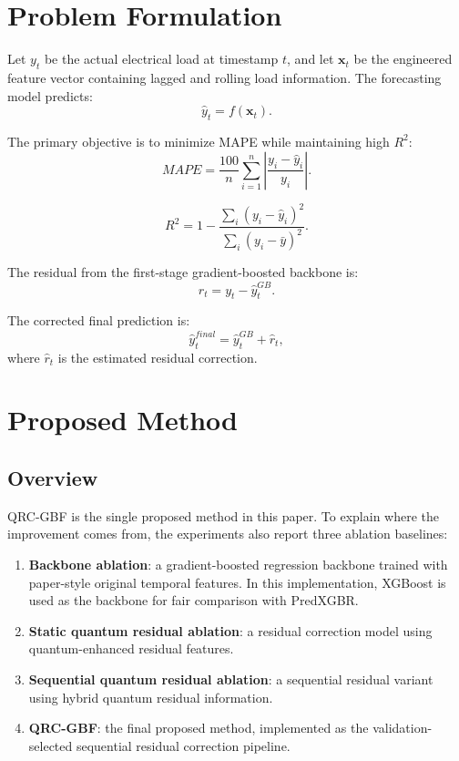 \documentclass[11pt]{article}
\begin{document}
\section{Problem Formulation}
Let $y_t$ be the actual electrical load at timestamp $t$, and let $\mathbf{x}_t$ be the engineered feature vector containing lagged and rolling load information. The forecasting model predicts:
\begin{equation}
\hat{y}_t = f(\mathbf{x}_t).
\end{equation}

The primary objective is to minimize MAPE while maintaining high $R^2$:
\begin{equation}
MAPE = \frac{100}{n}\sum_{i=1}^{n}\left|\frac{y_i-\hat{y}_i}{y_i}\right|.
\end{equation}

\begin{equation}
R^2 = 1 - \frac{\sum_i (y_i-\hat{y}_i)^2}{\sum_i (y_i-\bar{y})^2}.
\end{equation}

The residual from the first-stage gradient-boosted backbone is:
\begin{equation}
r_t = y_t - \hat{y}^{GB}_t.
\end{equation}

The corrected final prediction is:
\begin{equation}
\hat{y}^{final}_t = \hat{y}^{GB}_t + \hat{r}_t,
\end{equation}
where $\hat{r}_t$ is the estimated residual correction.

\section{Proposed Method}
\subsection{Overview}
QRC-GBF is the single proposed method in this paper. To explain where the improvement comes from, the experiments also report three ablation baselines:
\begin{enumerate}
    \item \textbf{Backbone ablation}: a gradient-boosted regression backbone trained with paper-style original temporal features. In this implementation, XGBoost is used as the backbone for fair comparison with PredXGBR.
    \item \textbf{Static quantum residual ablation}: a residual correction model using quantum-enhanced residual features.
    \item \textbf{Sequential quantum residual ablation}: a sequential residual variant using hybrid quantum residual information.
    \item \textbf{QRC-GBF}: the final proposed method, implemented as the validation-selected sequential residual correction pipeline.
\end{enumerate}
\end{document}
